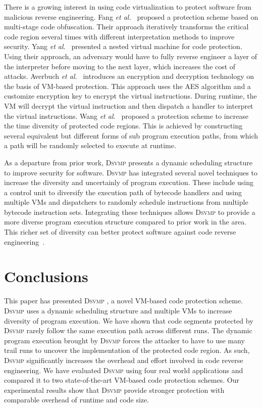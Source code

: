 \documentclass[times]{secauth}
\newcommand{\DSVMP}{\textsc{Dsvmp }}
\begin{document}
There is a growing interest in using code virtualization to protect software from malicious reverse engineering.
Fang \emph{et al.}~\cite{5fang2011multi} proposed a protection scheme based on multi-stage code obfuscation.
Their approach iteratively transforms the critical code region several times with different interpretation methods to improve security.
Yang \emph{et al.}~\cite{6ming2011software} presented a nested virtual machine for code protection.
Using their approach, an adversary would have to fully reverse engineer a layer of the interpreter before moving to the next layer,
which increases the cost of attacks.
Averbuch \emph{et al.}~\cite{27averbuch2011efficient} introduces an encryption and decryption technology
on the basis of VM-based protection. This approach uses the AES algorithm and a customize encryption key
to encrypt the virtual instructions. During runtime, the VM will decrypt the virtual instruction and then
dispatch a handler to interpret the virtual instructions.
Wang \emph{et al.}~\cite{7wang2014tdvmp} proposed a protection scheme to increase the time diversity of protected code regions.
This is achieved by constructing several equivalent but different forms of sub program execution paths,
from which a path will be randomly selected to execute at runtime.

As a departure from prior work, \DSVMP presents a dynamic scheduling structure to improve security for software.
\DSVMP has integrated several novel techniques to increase the diversity and uncertainly of program execution.
These include using a control unit to diversify the execution path of bytecode handlers and using multiple VMs
and dispatchers to randomly schedule instructions from multiple bytecode instruction sets.
Integrating these techniques allows \DSVMP to provide a more diverse program execution structure compared to prior work in the area.
This richer set of diversity can better protect software against code reverse engineering~\cite{20larsen2014sok}.


\section{Conclusions\label{sec:con}}
This paper has presented \DSVMP, a novel VM-based code protection scheme.
\DSVMP uses a dynamic scheduling structure and multiple VMs to increase
diversity of program execution. We have shown that code
segments protected by \DSVMP rarely follow the same execution path across
different runs. The dynamic program execution brought by \DSVMP forces the attacker
to have to use many trail runs to uncover the implementation of the protected code
region. As such, \DSVMP significantly increases the overhead and effort
involved in code reverse engineering. We have evaluated \DSVMP using four
real world applications and compared it to two state-of-the-art VM-based code
protection schemes. Our experimental results show that \DSVMP provide
stronger protection with comparable overhead of runtime and code size.
\end{document}
